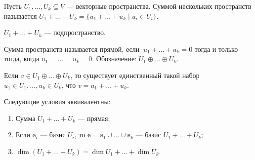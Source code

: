 \begin{Def}
	Пусть $U_1, \ldots, U_k \subseteq V$ --- векторные пространства. Суммой нескольких пространств называется $U_1 + \ldots + U_k = \{u_1 + \ldots + u_k \; | \; u_i \in U_i \}$.
\end{Def}

\begin{Task}
	$U_1+\ldots + U_k$ --- подпространство.
\end{Task}

\begin{Def}
	Сумма пространств называется прямой, если  $\:u_1 + \ldots + u_k = 0$ тогда и только тогда, когда $u_1 = \ldots = u_k = 0$. Обозначение: $U_1 \oplus \ldots \oplus U_k$.
\end{Def}

\begin{Task}
	Если $v \in U_1 \oplus \ldots \oplus U_k$, то существует единственный такой набор \\$u_1 \in U_1, \ldots, u_k \in U_k$, что $v = u_1 + \ldots + u_k$.
\end{Task}

\begin{Theorem}
	Следующие условия эквивалентны:
	\begin{enumerate}
		\item Сумма $U_1 + \ldots + U_k$ --- прямая;
		\item Если $\mathbb{e}_i$ --- базис $U_i$, то $\mathbb{e} = \mathbb{e}_1 \cup \ldots \cup \mathbb{e}_k$ --- базис $U_1 + \ldots + U_k;$
		\item $\dim(U_1 + \ldots + U_k) = \dim{U_1} + \ldots + \dim{U_k}.$
	\end{enumerate}
\end{Theorem}


